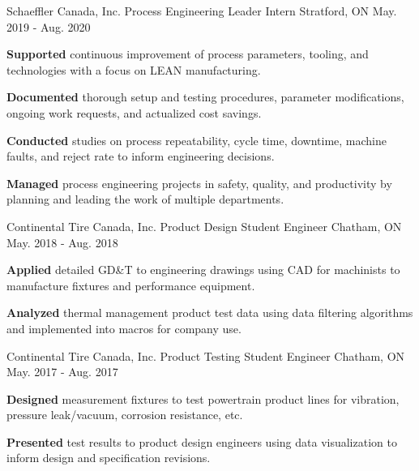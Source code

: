 \begin{cventries}
  \cventry
  {Schaeffler Canada, Inc.} %
  {Process Engineering Leader Intern} %
    {Stratford, ON} %
    {May. 2019 - Aug. 2020} %
    {
      \begin{cvitems} %
        \item {\textbf{Supported} continuous improvement of process parameters, tooling, and technologies with a focus on LEAN manufacturing.}
        \item {\textbf{Documented} thorough setup and testing procedures, parameter modifications, ongoing work requests, and actualized cost savings.}
        \item {\textbf{Conducted} studies on process repeatability, cycle time, downtime, machine faults, and reject rate to inform engineering decisions.}
        \item {\textbf{Managed} process engineering projects in safety, quality, and productivity by planning and leading the work of multiple departments.}
      \end{cvitems}
    }
    

  \cventry
  {Continental Tire Canada, Inc.} %
  {Product Design Student Engineer} %
    {Chatham, ON} %
    {May. 2018 - Aug. 2018} %
    {
      \begin{cvitems} %
        \item{\textbf{Applied} detailed GD\&T to engineering drawings using CAD for machinists to manufacture fixtures and performance equipment.}
        \item{\textbf{Analyzed} thermal management product test data using data filtering algorithms and implemented into macros for company use.}
      \end{cvitems}
    }
    

  \cventry
  {Continental Tire Canada, Inc.} %
  {Product Testing Student Engineer} %
    {Chatham, ON} %
    {May. 2017 - Aug. 2017} %
    {
      \begin{cvitems} %
        \item {\textbf{Designed} measurement fixtures to test powertrain product lines for vibration, pressure leak/vacuum, corrosion resistance, etc.}
        \item {\textbf{Presented} test results to product design engineers using data visualization to inform design and specification revisions.}
      \end{cvitems}
    }
    
\end{cventries}
